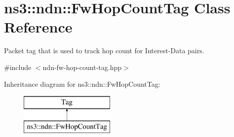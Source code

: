 \hypertarget{classns3_1_1ndn_1_1FwHopCountTag}{}\section{ns3\+:\+:ndn\+:\+:Fw\+Hop\+Count\+Tag Class Reference}
\label{classns3_1_1ndn_1_1FwHopCountTag}


Packet tag that is used to track hop count for Interest-\/\+Data pairs.  




{\ttfamily \#include $<$ndn-\/fw-\/hop-\/count-\/tag.\+hpp$>$}

Inheritance diagram for ns3\+:\+:ndn\+:\+:Fw\+Hop\+Count\+Tag\+:\begin{figure}[H]
\begin{center}
\leavevmode
\includegraphics[height=2.000000cm]{classns3_1_1ndn_1_1FwHopCountTag}
\end{center}
\end{figure}
